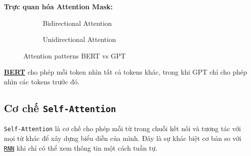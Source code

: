 \textbf{Trực quan hóa Attention Mask:}
\begin{figure}[H]
    \centering
    \begin{subfigure}[b]{0.45\textwidth}
        \centering
        \caption{Bidirectional Attention}
    \end{subfigure}
    \hfill
    \begin{subfigure}[b]{0.45\textwidth}
        \centering
        \caption{Unidirectional Attention}
    \end{subfigure}
    \caption{Attention patterns BERT vs GPT}
\end{figure}
\hyperref[acro:bert]{\textbf{BERT}} cho phép mỗi token nhìn tất cả tokens khác, trong khi GPT chỉ cho phép nhìn các tokens trước đó.

\subsection{Cơ chế \texttt{Self-Attention}}
\label{ssec:self_attention}

\texttt{Self-Attention} là cơ chế cho phép mỗi từ trong chuỗi kết nối và tương tác với mọi từ khác để xây dựng biểu diễn của mình. Đây là sự khác biệt cơ bản so với \hyperref[acro:rnn]{\texttt{RNN}} khi chỉ có thể xem thông tin một cách tuần tự.

